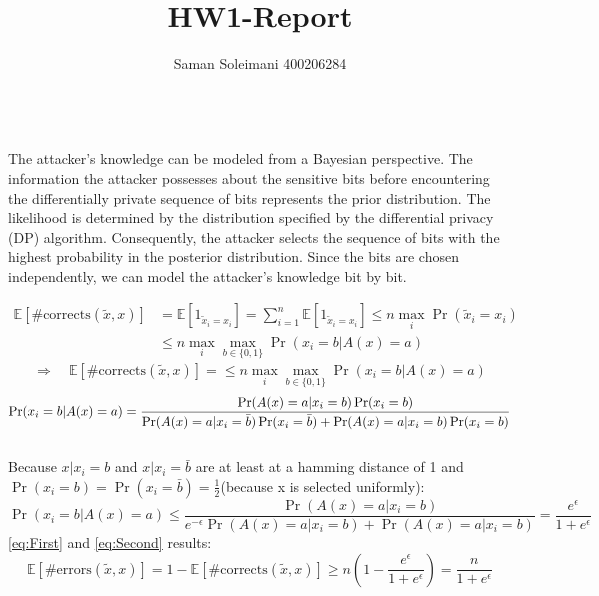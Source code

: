 \documentclass[12pt]{extarticle}
\title{\textbf{HW1-Report}}
\author{Saman Soleimani 400206284}
\date{}
\begin{document}
\\
The attacker's knowledge can be modeled from a Bayesian perspective. The information the attacker possesses about the sensitive bits before encountering the differentially private sequence of bits represents the prior distribution. The likelihood is determined by the distribution specified by the differential privacy (DP) algorithm. Consequently, the attacker selects the sequence of bits with the highest probability in the posterior distribution. Since the bits are chosen independently, we can model the attacker's knowledge bit by bit.

	\begin{align}
		 \mathbb{E}[\# \text{corrects}(\tilde{x},x)] 
		  &= \mathbb{E}[1_{\tilde{x}_i = x_i}] 
		  = \sum_{i=1}^{n} \mathbb{E}[1_{\tilde{x}_i = x_i}] 
		   \leq n \max_{i} \Pr(\tilde{x}_i = x_i)\nonumber\\
		&\leq n \max_{i}\max_{b\in\{0,1\}} \Pr(x_i = b|A(x) = a)\nonumber 
	\end{align}
	\begin{equation}
		\Rightarrow\quad\mathbb{E}[\# \text{corrects}(\tilde{x},x)] = \leq n \max_{i}\max_{b\in\{0,1\}} \Pr(x_i = b|A(x) = a)\label{eq:First}
	\end{equation}
	\begin{equation}
	 \Pr(x_i = b|A(x) = a)
	= \frac{\Pr(A(x) = a|x_i = b)\Pr(x_i = b)}{\Pr(A(x) = a|x_i = \bar{b})\Pr(x_i = \bar{b}) + \Pr(A(x) = a|x_i = b)\Pr(x_i = b)}\nonumber\\
	\end{equation}\\
		Because $x|x_i = b$  and  $x|x_i = \bar{b}$  are at least at a hamming distance of 1 and \\$ \Pr(x_i = b) = \Pr(x_i = \bar{b}) = \frac{1}{2}$(because x is selected uniformly):\\
	\begin{equation}
			\Pr(x_i = b|A(x) = a)
			\le \frac{\Pr(A(x) = a|x_i = b)}{e^{-\epsilon}\Pr(A(x) = a|x_i = b)+ \Pr(A(x) = a|x_i = b)} = \frac{e^{\epsilon}}{1+e^{\epsilon}}\label{eq:Second}
	\end{equation}
	\ref{eq:First} and \ref{eq:Second} results:
	\begin{equation}
	\mathbb{E}[\# \text{errors}(\tilde{x},x)] = 1 - \mathbb{E}[\# \text{corrects}(\tilde{x},x)] \ge n(1-\frac{e^{\epsilon}}{1+e^{\epsilon}}) = \frac{n}{1+e^{\epsilon}}\nonumber
	\end{equation}
\end{document}
